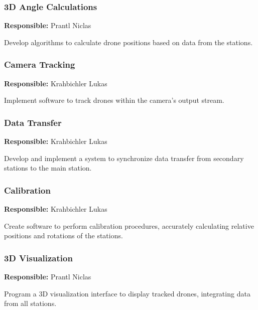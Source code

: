 \subsubsection{3D Angle Calculations}

\textbf{Responsible:} Prantl Niclas

Develop algorithms to calculate drone positions based on data from the stations.

\subsubsection{Camera Tracking}

\textbf{Responsible:} Krahbichler Lukas

Implement software to track drones within the camera's output stream.

\subsubsection{Data Transfer}

\textbf{Responsible:} Krahbichler Lukas

Develop and implement a system to synchronize data transfer from secondary stations to the main station.

\subsubsection{Calibration}

\textbf{Responsible:} Krahbichler Lukas

Create software to perform calibration procedures, accurately calculating relative positions and rotations of the stations.

\subsubsection{3D Visualization}

\textbf{Responsible:} Prantl Niclas

Program a 3D visualization interface to display tracked drones, integrating data from all stations.
